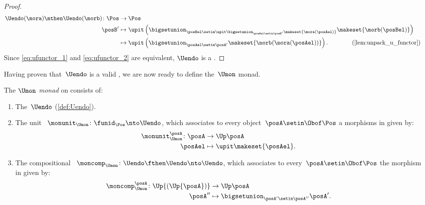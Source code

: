 \begin{proof}
\begin{equation}
\begin{aligned}
            \Uendo(\mora)\mthen \Uendo(\morb)\colon \Pos & \to \Pos \\
            \posB'                                       & \mapsto \upit \left(\bigsetunion_{\posBel\setin \upit \bigsetunion_{\posAel\setin \posB'}\makeset{\mora(\posAel)}}\makeset{\morb(\posBel)}\right) \\
                                                         & \mapsto \upit \left(\bigsetunion_{\posAel\setin \posA'} \makeset{ \morb(\mora(\posAel))}\right).
            \qquad \qquad (\cref{lem:unpack_u_functor})
        \end{aligned}
    \end{equation}
    Since \cref{eq:ufunctor_1} and \cref{eq:ufunctor_2} are equivalent, $\Uendo$ is a .
\end{proof}
Having proven that~$\Uendo$ is a valid , we are now ready to define the~$\Umon$ monad.
\begin{definition}
    \label{def:Umon}
    The \emph{$\Umon$ monad} on \Pos consists of:
    \begin{enumerate}
        \item The~$\Uendo$  (\cref{def:Uendo}).
        \item The unit ~$\monunit_{\Umon} \colon \funid_{\Pos}\nto \Uendo$, which associates to every object~$\posA \setin \Obof\Pos$ a morphisms in \Pos given by:
              \begin{equation}
                  \begin{aligned}
                      \monunit_{\Umon}^\posA\colon \posA & \to \Up \posA \\
                      \posAel                            & \mapsto \upit \makeset{\posAel}.
                  \end{aligned}
              \end{equation}
        \item The compositional ~$\moncomp_{\Umon}\colon \Uendo\fthen \Uendo\nto \Uendo$, which associates to every~$\posA\setin \Obof\Pos$ the morphism in \Pos given by:
              \begin{equation}
                  \begin{aligned}
                      \moncomp_{\Umon}^\posA\colon \Up{(\Up{\posA})} & \to \Up \posA \\
                      \posA''                                        & \mapsto \bigsetunion_{\posA'\setin \posA''}\posA'.
                  \end{aligned}
              \end{equation}
    \end{enumerate}
\end{definition}

